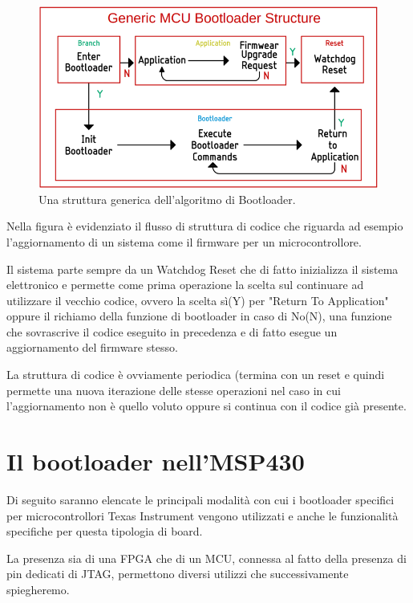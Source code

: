 \documentclass[LaM,binding=0.6cm]{../sapthesis}
\begin{document}
\begin{figure}[htbp]
\centerline{\includegraphics[scale=.33]{examples/Bootloader-System.png}}
\caption{Una struttura generica dell'algoritmo di Bootloader.}
\label{fig}
\end{figure}
\newline

Nella figura è evidenziato il flusso di struttura di codice che riguarda ad esempio l'aggiornamento di un sistema come il firmware per un microcontrollore.

Il sistema parte sempre da un Watchdog Reset che di fatto inizializza il sistema
elettronico e permette come prima operazione la scelta sul continuare ad utilizzare il vecchio codice, ovvero la scelta sì(Y) per "Return To Application" oppure il richiamo della funzione di bootloader in caso di No(N), una funzione che sovrascrive il codice eseguito in precedenza e di fatto esegue un aggiornamento del firmware stesso.

La struttura di codice è ovviamente periodica (termina con un reset e quindi permette una nuova iterazione delle stesse operazioni nel caso in cui l'aggiornamento non è quello voluto oppure si continua con il codice già presente.



\section{Il bootloader nell'MSP430}
Di seguito saranno elencate le principali modalità con cui i bootloader specifici per microcontrollori Texas Instrument vengono utilizzati e anche le funzionalità specifiche per questa tipologia di board.

La presenza sia di una FPGA che di un MCU, connessa al fatto della presenza di pin dedicati di JTAG, permettono diversi utilizzi che successivamente spiegheremo.
\end{document}
